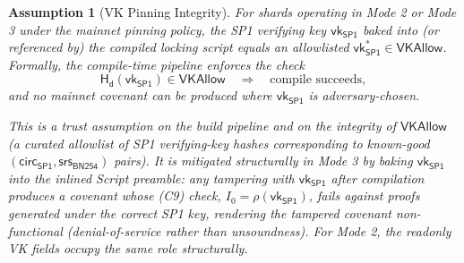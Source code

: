 \documentclass[11pt,a4paper]{article}
\newtheorem{assumption}{Assumption}[section]
\newcommand{\Hashd}{\mathsf{H_d}}        %
\newcommand{\SPone}{\mathsf{SP1}}
\newcommand{\SRS}{\mathsf{srs}_{\mathsf{BN254}}}  %
\newcommand{\vkSP}{\mathsf{vk}_{\SPone}}           %
\newcommand{\VKAllow}{\mathsf{VKAllow}}            %
\begin{document}
\begin{assumption}[VK Pinning Integrity]\label{ass:vkpin}
For shards operating in Mode 2 or Mode 3 under the mainnet pinning policy, the SP1 verifying key $\vkSP$ baked into (or referenced by) the compiled locking script equals an allowlisted $\vkSP^* \in \VKAllow$. Formally, the compile-time pipeline enforces the check
\[
    \Hashd(\vkSP) \in \VKAllow \quad \Rightarrow \quad \text{compile succeeds},
\]
and no mainnet covenant can be produced where $\vkSP$ is adversary-chosen.

This is a trust assumption on the build pipeline and on the integrity of $\VKAllow$ (a curated allowlist of SP1 verifying-key hashes corresponding to known-good $(\mathsf{circ}_{\SPone}, \SRS)$ pairs). It is mitigated structurally in Mode 3 by baking $\vkSP$ into the inlined Script preamble: any tampering with $\vkSP$ after compilation produces a covenant whose (C9) check, $I_0 = \rho(\vkSP)$, fails against proofs generated under the correct SP1 key, rendering the tampered covenant non-functional (denial-of-service rather than unsoundness). For Mode 2, the readonly VK fields occupy the same role structurally.
\end{assumption}
\end{document}
